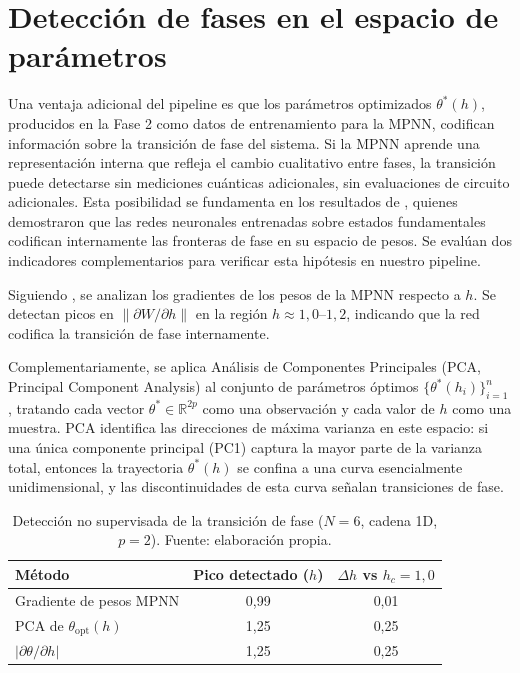 \documentclass[11pt,a4paper,spanish]{book}
\begin{document}
\section{Detección de fases en el espacio de parámetros}
\label{sec:phase_detection}

Una ventaja adicional del pipeline es que los parámetros optimizados $\theta^*(h)$, producidos en la Fase 2 como datos de entrenamiento para la MPNN, codifican información sobre la transición de fase del sistema. Si la MPNN aprende una representación interna que refleja el cambio cualitativo entre fases, la transición puede detectarse sin mediciones cuánticas adicionales, sin evaluaciones de circuito adicionales. Esta posibilidad se fundamenta en los resultados de \citet{hernandes2025}, quienes demostraron que las redes neuronales entrenadas sobre estados fundamentales codifican internamente las fronteras de fase en su espacio de pesos. Se evalúan dos indicadores complementarios para verificar esta hipótesis en nuestro pipeline.

Siguiendo \citet{hernandes2025}, se analizan los gradientes de los pesos de la MPNN respecto a $h$. Se detectan picos en $\|\partial W / \partial h\|$ en la región $h \approx 1,0$--$1,2$, indicando que la red codifica la transición de fase internamente.

Complementariamente, se aplica Análisis de Componentes Principales (PCA, Principal Component Analysis) al conjunto de parámetros óptimos $\{\theta^*(h_i)\}_{i=1}^{n}$, tratando cada vector $\theta^* \in \mathbb{R}^{2p}$ como una observación y cada valor de $h$ como una muestra. PCA identifica las direcciones de máxima varianza en este espacio: si una única componente principal (PC1) captura la mayor parte de la varianza total, entonces la trayectoria $\theta^*(h)$ se confina a una curva esencialmente unidimensional, y las discontinuidades de esta curva señalan transiciones de fase.

\begin{table}[h]
\centering
\caption[Detección no supervisada de la transición de fase]{Detección no supervisada de la transición de fase ($N = 6$, cadena 1D, $p = 2$). Fuente: elaboración propia.}
\label{tab:unsupervised_detection}
\begin{tabular}{lcc}
\toprule
\textbf{Método} & \textbf{Pico detectado ($h$)} & \textbf{$\Delta h$ vs $h_c = 1,0$} \\
\midrule
Gradiente de pesos MPNN & 0,99 & 0,01 \\
PCA de $\theta_{\text{opt}}(h)$ & 1,25 & 0,25 \\
$|\partial\theta/\partial h|$ & 1,25 & 0,25 \\
\bottomrule
\end{tabular}
\end{table}
\end{document}
